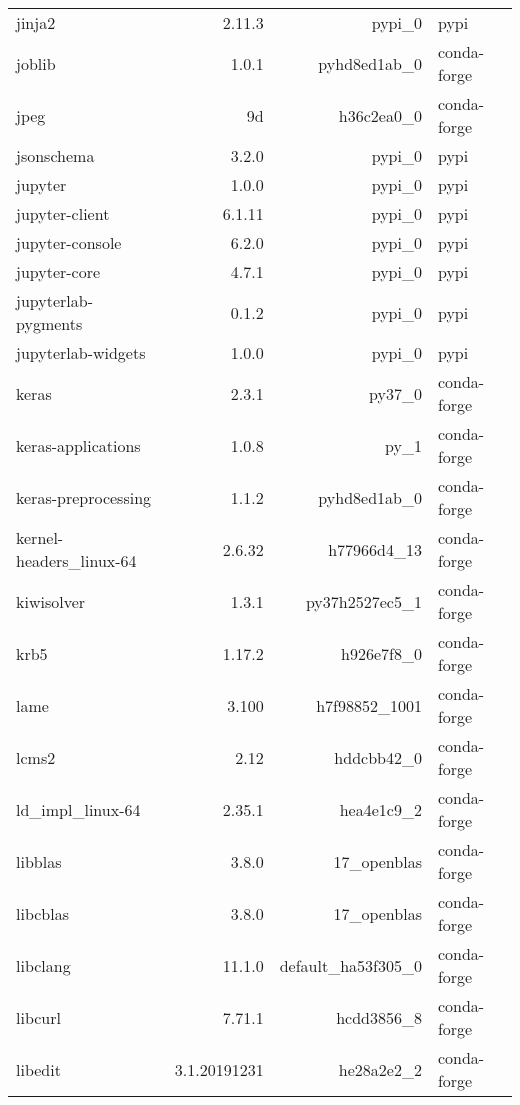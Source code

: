\begin{table}
\begin{center}
\begin{tabular}{|l|r|r|l|}
			jinja2 &2.11.3 & pypi\_0 &pypi \\
			joblib &1.0.1 & pyhd8ed1ab\_0 &conda-forge \\
			jpeg &9d & h36c2ea0\_0 &conda-forge \\
			jsonschema &3.2.0 & pypi\_0 &pypi \\
			jupyter &1.0.0 & pypi\_0 &pypi \\
			jupyter-client &6.1.11 & pypi\_0 &pypi \\
			jupyter-console &6.2.0 & pypi\_0 &pypi \\
			jupyter-core &4.7.1 & pypi\_0 &pypi \\
			jupyterlab-pygments &0.1.2 & pypi\_0 &pypi \\
			jupyterlab-widgets &1.0.0 & pypi\_0 &pypi \\
			keras &2.3.1 & py37\_0 &conda-forge \\
			keras-applications &1.0.8 & py\_1 &conda-forge \\
			keras-preprocessing &1.1.2 & pyhd8ed1ab\_0 &conda-forge \\
			kernel-headers\_linux-64 &2.6.32 & h77966d4\_13 &conda-forge \\
			kiwisolver &1.3.1 & py37h2527ec5\_1 &conda-forge \\
			krb5 &1.17.2 & h926e7f8\_0 &conda-forge \\
			lame &3.100 & h7f98852\_1001 &conda-forge \\
			lcms2 &2.12 & hddcbb42\_0 &conda-forge \\
			ld\_impl\_linux-64 &2.35.1 & hea4e1c9\_2 &conda-forge \\
			libblas &3.8.0 & 17\_openblas &conda-forge \\
			libcblas &3.8.0 & 17\_openblas &conda-forge \\
			libclang &11.1.0 & default\_ha53f305\_0 & conda-forge \\
			libcurl &7.71.1 & hcdd3856\_8 &conda-forge \\
			libedit &3.1.20191231 & he28a2e2\_2 &conda-forge \\
				
		\end{tabular}
	\end{center}
\end{table}			



